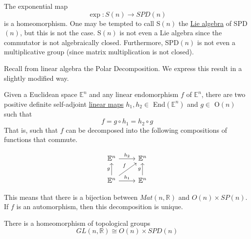   \begin{lemma}
    \label{thm:expsntospdn-is-a-homeomorphism}
    The exponential map 
    \begin{equation}
      \exp: S(n) \rightarrow SPD(n)
    \end{equation}
    is a homeomorphism. One may be tempted to call S$(n)$ the \hyperref[def:lie-algebra]{Lie algebra} of SPD$(n)$, but this is not the case. S$(n)$ is not even a Lie algebra since the commutator is not algebraically closed. Furthermore, SPD$(n)$ is not even a multiplicative group (since matrix multiplication is not closed). 
  \end{lemma}

  Recall from linear algebra the Polar Decomposition. We express this result in a slightly modified way. 

  \begin{theorem}
    \label{thm:polar-decomposition}
    Given a Euclidean space $\mathbb{E}^n$ and any linear endomorphism $f$ of $\mathbb{E}^n$, there are two positive definite self-adjoint \hyperref[thm:linear-map]{linear maps} $h_1, h_2 \in$ End$(\mathbb{E}^n)$ and $g \in$ O$(n)$ such that
    \begin{equation}
      f = g \circ h_1 = h_2 \circ g
    \end{equation}
    That is, such that $f$ can be decomposed into the following compositions of functions that commute. 

    \begin{equation}
      \begin{tikzcd}
          \mathbb{E}^n \arrow{r}{h_2} & \mathbb{E}^n \\
          \mathbb{E}^n \arrow{u}{g} \arrow{ur}{f} \arrow{r}{h_1} & \mathbb{E}^n \arrow{u}{g}
          \end{tikzcd}
    \end{equation}

    This means that there is a bijection between $Mat(n, \mathbb{R})$ and $O(n) \times SP(n)$. If $f$ is an automorphism, then this decomposition is unique. 
  \end{theorem}

  \begin{corollary}
    \label{thm:polar-decomposition-of-glnr}
    There is a homeomorphism of topological groups
    \begin{equation}
      GL(n, \mathbb{R}) \cong O(n) \times SPD(n)
    \end{equation}
  \end{corollary}

